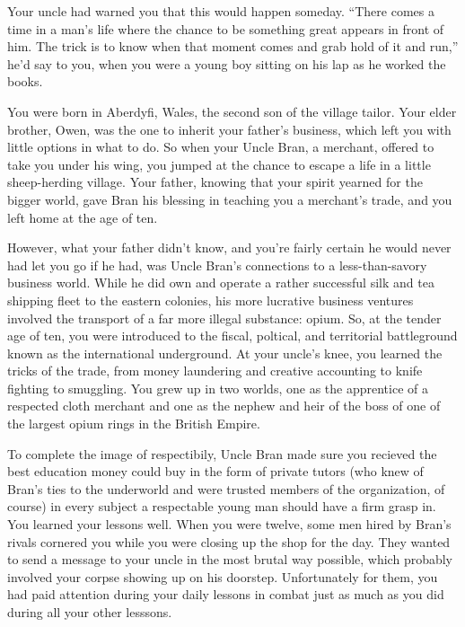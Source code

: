 \documentclass[char]{airship}
\begin{document}
\name{\cDealer{}}



Your uncle had warned you that this would happen someday.  ``There
comes a time in a man's life where the chance to be something great
appears in front of him.  The trick is to know when that moment comes
and grab hold of it and run,'' he'd say to you, when you were a young
boy sitting on his lap as he worked the books.

You were born in Aberdyfi, Wales, the second son of the village
tailor.  Your elder brother, Owen, was the one to inherit your
father's business, which left you with little options in what to do.
So when your Uncle Bran, a merchant, offered to take you under his
wing, you jumped at the chance to escape a life in a little
sheep-herding village.  Your father, knowing that your spirit yearned
for the bigger world, gave Bran his blessing in teaching you a
merchant's trade, and you left home at the age of ten.

However, what your father didn't know, and you're fairly certain he
would never had let you go if he had, was Uncle Bran's connections to
a less-than-savory business world.  While he did own and operate a
rather successful silk and tea shipping fleet to the eastern colonies,
his more lucrative business ventures involved the transport of a far
more illegal substance: opium.  So, at the tender age of ten, you were
introduced to the fiscal, poltical, and territorial battleground known
as the international underground.  At your uncle's knee, you learned
the tricks of the trade, from money laundering and creative accounting
to knife fighting to smuggling.  You grew up in two worlds, one as the
apprentice of a respected cloth merchant and one as the nephew and
heir of the boss of one of the largest opium rings in the British
Empire.

To complete the image of respectibily, Uncle Bran made sure you
recieved the best education money could buy in the form of private
tutors (who knew of Bran's ties to the underworld and were trusted
members of the organization, of course) in every subject a respectable
young man should have a firm grasp in.  You learned your lessons well.
When you were twelve, some men hired by Bran's rivals cornered you
while you were closing up the shop for the day.  They wanted to send a
message to your uncle in the most brutal way possible, which probably
involved your corpse showing up on his doorstep.  Unfortunately for
them, you had paid attention during your daily lessons in combat just
as much as you did during all your other lesssons.
\end{document}
